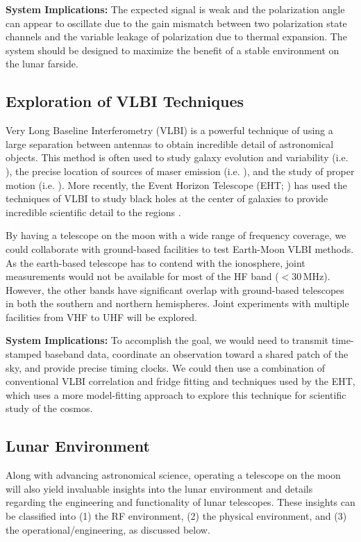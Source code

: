 \textbf{System Implications:} 
The expected signal is weak and the polarization angle can appear to oscillate due to the gain mismatch between two polarization state channels and the variable leakage of polarization due to thermal expansion. The system should be designed to maximize the benefit of a stable environment on the lunar farside.



\subsection{Exploration of VLBI Techniques}
Very Long Baseline Interferometry (VLBI) is a powerful technique of using a large separation between antennas to obtain incredible detail of astronomical objects. This method is often used to study galaxy evolution and variability (i.e. \citealt{Sheldahl_2025}), the precise location of sources of maser emission (i.e. \citealt{Shinnaga_2025}), and the study of proper motion (i.e. \citealt{Kumar_2025}). More recently, the Event Horizon Telescope (EHT; \citealt{Chael_2018}) has used the techniques of VLBI to study black holes at the center of galaxies to provide incredible scientific detail to the regions \citep{M87}.

By having a telescope on the moon with a wide range of frequency coverage, we could collaborate with ground-based facilities to test Earth-Moon VLBI methods. As the earth-based telescope has to contend with the ionosphere, joint measurements would not be available for most of the HF band ($<$30\,MHz). However, the other bands have significant overlap with ground-based telescopes in both the southern and northern hemispheres.  Joint experiments with multiple facilities from VHF to UHF will be explored. 

\textbf{System Implications:} To accomplish the goal, we would need to transmit time-stamped baseband data, coordinate an observation toward a shared patch of the sky, and provide precise timing clocks. We could then use a combination of conventional VLBI correlation and fridge fitting and techniques used by the EHT, which uses a more model-fitting approach to explore this technique for scientific study of the cosmos.

\subsection{Lunar Environment}
Along with advancing astronomical science, operating a telescope on the moon will also yield invaluable insights into the lunar environment and details regarding the engineering and functionality of lunar telescopes. These insights can be classified into (1) the RF environment, (2) the physical environment, and (3) the operational/engineering, as discussed below. 

